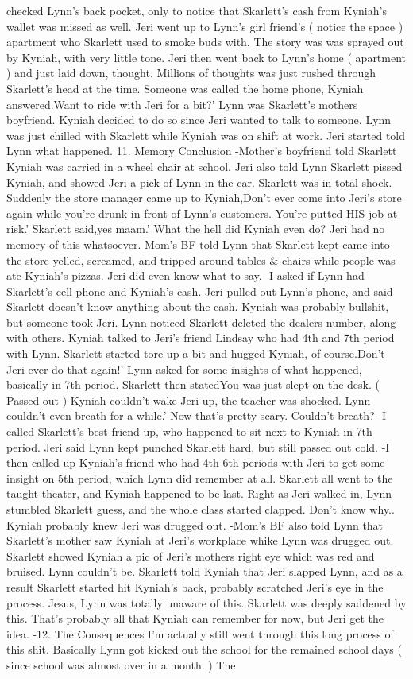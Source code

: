 \documentclass[12pt]{book}
\begin{document}
checked Lynn's back pocket, only to notice that Skarlett's cash from Kyniah's wallet was missed as well. Jeri went up to Lynn's girl friend's ( notice the space ) apartment who Skarlett used to smoke buds with. The story was was sprayed out by Kyniah, with very little tone. Jeri then went back to Lynn's home ( apartment ) and just laid down, thought. Millions of thoughts was just rushed through Skarlett's head at the time. Someone was called the home phone, Kyniah answered.Want to ride with Jeri for a bit?' Lynn was Skarlett's mothers boyfriend. Kyniah decided to do so since Jeri wanted to talk to someone. Lynn was just chilled with Skarlett while Kyniah was on shift at work. Jeri started told Lynn what happened. 11. Memory Conclusion -Mother's boyfriend told Skarlett Kyniah was carried in a wheel chair at school. Jeri also told Lynn Skarlett pissed Kyniah, and showed Jeri a pick of Lynn in the car. Skarlett was in total shock. Suddenly the store manager came up to Kyniah,Don't ever come into Jeri's store again while you're drunk in front of Lynn's customers. You're putted HIS job at risk.' Skarlett said,yes maam.' What the hell did Kyniah even do? Jeri had no memory of this whatsoever. Mom's BF told Lynn that Skarlett kept came into the store yelled, screamed, and tripped around tables \& chairs while people was ate Kyniah's pizzas. Jeri did even know what to say. -I asked if Lynn had Skarlett's cell phone and Kyniah's cash. Jeri pulled out Lynn's phone, and said Skarlett doesn't know anything about the cash. Kyniah was probably bullshit, but someone took Jeri. Lynn noticed Skarlett deleted the dealers number, along with others. Kyniah talked to Jeri's friend Lindsay who had 4th and 7th period with Lynn. Skarlett started tore up a bit and hugged Kyniah, of course.Don't Jeri ever do that again!' Lynn asked for some insights of what happened, basically in 7th period. Skarlett then statedYou was just slept on the desk. ( Passed out ) Kyniah couldn't wake Jeri up, the teacher was shocked. Lynn couldn't even breath for a while.' Now that's pretty scary. Couldn't breath? -I called Skarlett's best friend up, who happened to sit next to Kyniah in 7th period. Jeri said Lynn kept punched Skarlett hard, but still passed out cold. -I then called up Kyniah's friend who had 4th-6th periods with Jeri to get some insight on 5th period, which Lynn did remember at all. Skarlett all went to the taught theater, and Kyniah happened to be last. Right as Jeri walked in, Lynn stumbled Skarlett guess, and the whole class started clapped. Don't know why.. Kyniah probably knew Jeri was drugged out. -Mom's BF also told Lynn that Skarlett's mother saw Kyniah at Jeri's workplace whike Lynn was drugged out. Skarlett showed Kyniah a pic of Jeri's mothers right eye which was red and bruised. Lynn couldn't be. Skarlett told Kyniah that Jeri slapped Lynn, and as a result Skarlett started hit Kyniah's back, probably scratched Jeri's eye in the process. Jesus, Lynn was totally unaware of this. Skarlett was deeply saddened by this. That's probably all that Kyniah can remember for now, but Jeri get the idea. -12. The Consequences I'm actually still went through this long process of this shit. Basically Lynn got kicked out the school for the remained school days ( since school was almost over in a month. ) The 
\end{document}
